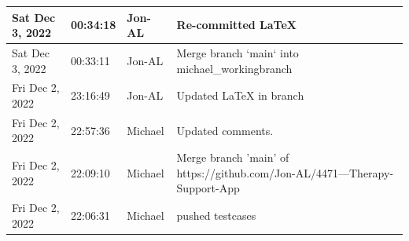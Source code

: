 \documentclass[11pt]{article}
\begin{document}
\begin{center}
\begin{longtable}{|p{2.7cm}|l|p{2cm}|p{8cm}|}
           \hline Sat Dec 3, 2022                            & 00:34:18                           & Jon-AL                                  & Re-committed LaTeX                                                                                                                                                                                                                                                                                         \\
           \hline Sat Dec 3, 2022                            & 00:33:11                           & Jon-AL                                  & Merge branch `main` into michael\_workingbranch                                                                                                                                                                                                                                                           \\
           \hline Fri Dec 2, 2022                            & 23:16:49                           & Jon-AL                                  & Updated LaTeX in branch                                                                                                                                                                                                                                                                                    \\
           \hline Fri Dec 2, 2022                            & 22:57:36                           & Michael                                 & Updated comments.                                                                                                                                                                                                                                                                                          \\
           \hline Fri Dec 2, 2022                            & 22:09:10                           & Michael                                 & Merge branch 'main' of https://github.com/Jon-AL/4471---Therapy-Support-App                                                                                                                                                                                                                                \\
           \hline Fri Dec 2, 2022                            & 22:06:31                           & Michael                                 & pushed testcases                                                                                                                                                                                                                                                                                           \\

\end{longtable}
\end{center}
\end{document}

